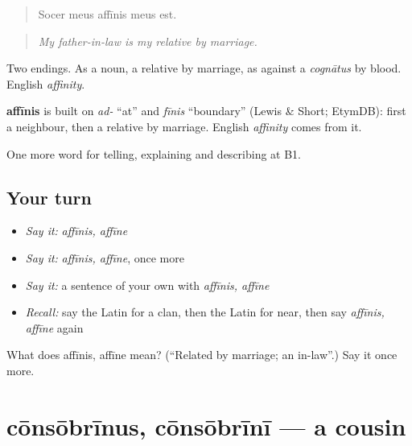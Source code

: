 \begin{quote}
Socer meus affīnis meus est.
\end{quote}

\begin{quote}
\emph{My father-in-law is my relative by marriage.}
\end{quote}

Two endings. As a noun, a relative by marriage, as against a \emph{cognātus} by blood. English \emph{affinity}.

\begin{cousinweb}
\textbf{affīnis} is built on \emph{ad-} \textquotedblleft{}at\textquotedblright{} and \emph{fīnis} \textquotedblleft{}boundary\textquotedblright{} (Lewis \& Short; EtymDB): first a neighbour, then a relative by marriage. English \emph{affinity} comes from it.
\end{cousinweb}

\begin{grammarlens}[title={What you've built}]
One more word for telling, explaining and describing at B1.
\end{grammarlens}

\subsection*{Your turn}
\begin{itemize}
\raggedright
  \item \emph{Say it:} \emph{affīnis, affīne}
  \item \emph{Say it:} \emph{affīnis, affīne}, once more
  \item \emph{Say it:} a sentence of your own with \emph{affīnis, affīne}
  \item \emph{Recall:} say the Latin for a clan, then the Latin for near, then say \emph{affīnis, affīne} again
\end{itemize}

\begin{tcolorbox}[breakable,colback=teal!4,colframe=teal!35!black,title={Before you move on}]
What does affīnis, affīne mean? (\textquotedblleft{}Related by marriage; an in-law\textquotedblright{}.) Say it once more.
\end{tcolorbox}
\section[cōnsōbrīnus, cōnsōbrīnī]{cōnsōbrīnus, cōnsōbrīnī — a cousin}

\label{lesson:LA-C528-consobrinus}




